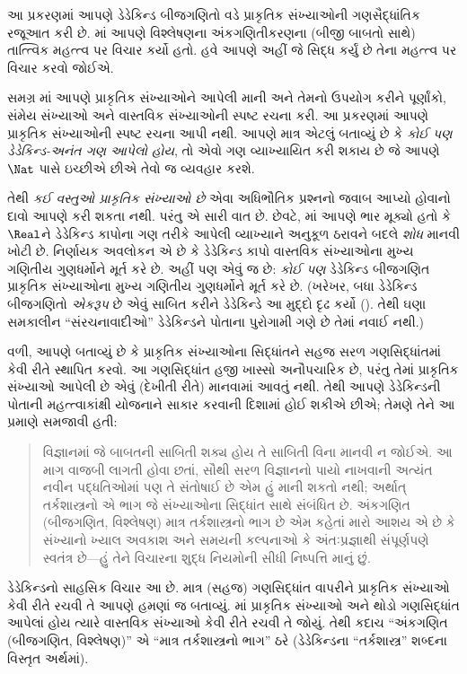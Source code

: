 \begingroup
\makeatletter{}\makeatother


\label{guunit:OLP-0053}


આ પ્રકરણમાં આપણે ડેડેકિન્ડ બીજગણિતો વડે પ્રાકૃતિક સંખ્યાઓની
ગણસૈદ્ધાંતિક રજૂઆત કરી છે. માં આપણે
વિશ્લેષણના અંકગણિતીકરણના (બીજી બાબતો સાથે) તાત્ત્વિક મહત્ત્વ પર
વિચાર કર્યો હતો. હવે આપણે અહીં જે સિદ્ધ કર્યું છે તેના મહત્ત્વ પર
વિચાર કરવો જોઈએ.

સમગ્ર માં આપણે પ્રાકૃતિક સંખ્યાઓને આપેલી
માની અને તેમનો ઉપયોગ કરીને પૂર્ણાંકો, સંમેય સંખ્યાઓ અને વાસ્તવિક
સંખ્યાઓની સ્પષ્ટ રચના કરી. આ પ્રકરણમાં આપણે પ્રાકૃતિક સંખ્યાઓની સ્પષ્ટ
રચના આપી નથી. આપણે માત્ર એટલું બતાવ્યું છે કે \emph{કોઈ પણ
ડેડેકિન્ડ-અનંત ગણ આપેલો હોય}, તો એવો ગણ વ્યાખ્યાયિત કરી શકાય છે જે
આપણે~$\Nat$ પાસે ઇચ્છીએ છીએ તેવો જ વ્યવહાર કરશે.

તેથી \emph{કઈ વસ્તુઓ પ્રાકૃતિક સંખ્યાઓ છે} એવા અધિભૌતિક પ્રશ્નનો
જવાબ આપ્યો હોવાનો દાવો આપણે કરી શકતા નથી. પરંતુ એ સારી વાત છે. છેવટે,
માં આપણે ભાર મૂક્યો હતો કે
$\Real$ને ડેડેકિન્ડ કાપોના ગણ તરીકે આપેલી વ્યાખ્યાને અનુકૂળ ઠરાવને
બદલે \emph{શોધ} માનવી ખોટી છે. નિર્ણાયક અવલોકન એ છે કે ડેડેકિન્ડ
કાપો વાસ્તવિક સંખ્યાઓના મુખ્ય ગણિતીય ગુણધર્મોને મૂર્ત કરે છે. અહીં
પણ એવું જ છે: \emph{કોઈ પણ} ડેડેકિન્ડ બીજગણિત પ્રાકૃતિક સંખ્યાઓના
મુખ્ય ગણિતીય ગુણધર્મોને મૂર્ત કરે છે. (ખરેખર, બધા ડેડેકિન્ડ બીજગણિતો
\emph{એકરૂપ} છે એવું સાબિત કરીને ડેડેકિન્ડે આ મુદ્દો દૃઢ કર્યો
(\citeyear[Theorems
132--3]{Dedekind1888}). તેથી ઘણા સમકાલીન
``સંરચનાવાદીઓ'' ડેડેકિન્ડને પોતાના પુરોગામી ગણે છે તેમાં નવાઈ નથી.)

 વળી, આપણે બતાવ્યું છે કે પ્રાકૃતિક સંખ્યાઓના સિદ્ધાંતને સહજ સરળ
 ગણસિદ્ધાંતમાં કેવી રીતે સ્થાપિત કરવો. આ ગણસિદ્ધાંત હજી ખાસ્સો
 અનૌપચારિક છે, પરંતુ તેમાં પ્રાકૃતિક સંખ્યાઓ આપેલી છે એવું (દેખીતી
 રીતે) માનવામાં આવતું નથી. તેથી આપણે ડેડેકિન્ડની પોતાની મહત્ત્વાકાંક્ષી
 યોજનાને સાકાર કરવાની દિશામાં હોઈ શકીએ છીએ; તેમણે તેને આ પ્રમાણે
 સમજાવી હતી:
\begin{quote}
	વિજ્ઞાનમાં જે બાબતની સાબિતી શક્ય હોય તે સાબિતી વિના માનવી ન જોઈએ.
	આ માગ વાજબી લાગતી હોવા છતાં, સૌથી સરળ વિજ્ઞાનનો પાયો નાખવાની
	અત્યંત નવીન પદ્ધતિઓમાં પણ તે સંતોષાઈ છે એમ હું માની શકતો નથી;
	અર્થાત્ તર્કશાસ્ત્રનો એ ભાગ જે સંખ્યાઓના સિદ્ધાંત સાથે સંબંધિત છે.
	અંકગણિત (બીજગણિત, વિશ્લેષણ) માત્ર તર્કશાસ્ત્રનો ભાગ છે એમ કહેતાં
	મારો આશય એ છે કે સંખ્યાનો ખ્યાલ અવકાશ અને સમયની કલ્પનાઓ કે
	અંતઃપ્રજ્ઞાથી સંપૂર્ણપણે સ્વતંત્ર છે---હું તેને વિચારના શુદ્ધ
	નિયમોની સીધી નિષ્પત્તિ માનું છું.
	\citep[preface]{Dedekind1888}
\end{quote}
ડેડેકિન્ડનો સાહસિક વિચાર આ છે. માત્ર (સહજ) ગણસિદ્ધાંત વાપરીને
પ્રાકૃતિક સંખ્યાઓ કેવી રીતે રચવી તે આપણે હમણાં જ બતાવ્યું.
માં પ્રાકૃતિક સંખ્યાઓ અને થોડો ગણસિદ્ધાંત
આપેલાં હોય ત્યારે વાસ્તવિક સંખ્યાઓ કેવી રીતે રચવી તે જોયું. તેથી કદાચ
``અંકગણિત (બીજગણિત, વિશ્લેષણ)'' એ ``માત્ર તર્કશાસ્ત્રનો ભાગ'' ઠરે
(ડેડેકિન્ડના ``તર્કશાસ્ત્ર'' શબ્દના વિસ્તૃત અર્થમાં).

